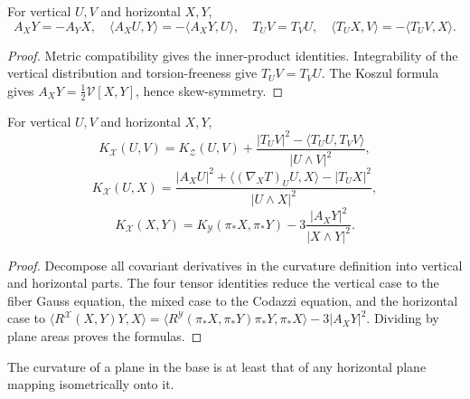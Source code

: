 \begin{example}
\label{ex:chow-ii-oneill-tensor-symmetries}

For vertical \(U,V\) and horizontal \(X,Y\),
\[
 A_XY=-A_YX,\quad \langle A_XU,Y\rangle=-\langle A_XY,U\rangle,
\quad T_UV=T_VU,\quad
\langle T_UX,V\rangle=-\langle T_UV,X\rangle.
\]
\end{example}
\begin{proof}
\sketch
Metric compatibility gives the inner-product identities.  Integrability of
the vertical distribution and torsion-freeness give \(T_UV=T_VU\).  The
Koszul formula gives \(A_XY=\tfrac12\mathcal V[X,Y]\), hence skew-symmetry.
\end{proof}

\begin{theorem}
\label{thm:chow-ii-oneill-curvature-formulas}

For vertical \(U,V\) and horizontal \(X,Y\),
\[
 K_{\mathcal X}(U,V)=K_{\mathcal Z}(U,V)
 +\frac{|T_UV|^2-\langle T_UU,T_VV\rangle}{|U\wedge V|^2},
\]
\[
 K_{\mathcal X}(U,X)=
 \frac{|A_XU|^2+\langle(\nabla_XT)_UU,X\rangle-|T_UX|^2}{|U\wedge X|^2},
\]
\[
 K_{\mathcal X}(X,Y)=K_{\mathcal Y}(\pi_*X,\pi_*Y)
 -3\frac{|A_XY|^2}{|X\wedge Y|^2}.
\]
\end{theorem}
\begin{proof}
\sketch
{}
Decompose all covariant derivatives in the curvature definition into vertical
and horizontal parts.  The four tensor identities reduce the vertical case
to the fiber Gauss equation, the mixed case to the Codazzi equation, and the
horizontal case to
\(\langle R^{\mathcal X}(X,Y)Y,X\rangle
=\langle R^{\mathcal Y}(\pi_*X,\pi_*Y)\pi_*Y,\pi_*X\rangle-3|A_XY|^2\).
Dividing by plane areas proves the formulas.
\end{proof}

\begin{remark}
\label{rem:chow-ii-submersion-increases-curvature}


The curvature of a plane in the base is at least that of any horizontal plane
mapping isometrically onto it.
\end{remark}


